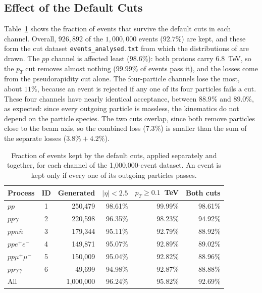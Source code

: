 \documentclass{article}
\begin{document}
\subsection{Effect of the Default Cuts}
\label{ssec:cut_effect}
Table~\ref{tab:acceptance} shows the fraction of events that survive the default cuts in each channel. Overall, $926{,}892$ of the $1{,}000{,}000$ events ($92.7\%$) are kept, and these form the cut dataset \texttt{events\_analysed.txt} from which the distributions of  are drawn. The $pp$ channel is affected least ($98.6\%$): both protons carry $6.8$~TeV, so the $p_T$ cut removes almost nothing ($99.99\%$ of events pass it), and the losses come from the pseudorapidity cut alone. The four-particle channels lose the most, about $11\%$, because an event is rejected if any one of its four particles fails a cut. These four channels have nearly identical acceptance, between $88.9\%$ and $89.0\%$, as expected: since every outgoing particle is massless, the kinematics do not depend on the particle species. The two cuts overlap, since both remove particles close to the beam axis, so the combined loss ($7.3\%$) is smaller than the sum of the separate losses ($3.8\% + 4.2\%$).

\begin{table}[H]
\centering
\begin{tabular}{l c r r r r}
\hline
Process & ID & Generated & $|\eta| < 2.5$ & $p_T \ge 0.1$~TeV & Both cuts \\
\hline
$pp$              & 1 & 250{,}479 & 98.61\% & 99.99\% & 98.61\% \\
$pp\gamma$        & 2 & 220{,}598 & 96.35\% & 98.23\% & 94.92\% \\
$ppn\overline{n}$ & 3 & 179{,}344 & 95.11\% & 92.79\% & 88.92\% \\
$ppe^+e^-$        & 4 & 149{,}871 & 95.07\% & 92.89\% & 89.02\% \\
$pp\mu^+\mu^-$    & 5 & 150{,}009 & 95.04\% & 92.82\% & 88.96\% \\
$pp\gamma\gamma$  & 6 & 49{,}699  & 94.98\% & 92.87\% & 88.88\% \\
\hline
All               &   & 1{,}000{,}000 & 96.24\% & 95.82\% & 92.69\% \\
\hline
\end{tabular}
\caption{Fraction of events kept by the default cuts, applied separately and together, for each channel of the 1{,}000{,}000-event dataset. An event is kept only if every one of its outgoing particles passes.}
\label{tab:acceptance}
\end{table}
\end{document}
